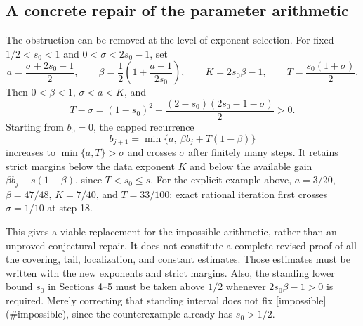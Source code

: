 \documentclass[10pt]{article}
\begin{document}
\subsection*{A concrete repair of the parameter arithmetic}
The obstruction can be removed at the level of exponent selection. For fixed \(1/2<s_0<1\) and \(0<\sigma<2s_0-1\), set \[a=\frac{\sigma+2s_0-1}{2},\qquad
 \beta=\frac12\left(1+\frac{a+1}{2s_0}\right),\qquad
 K=2s_0\beta-1,\qquad T=\frac{s_0(1+\sigma)}2.\] Then \(0<\beta<1\), \(\sigma<a<K\), and \[T-\sigma=(1-s_0)^2+
       \frac{(2-s_0)(2s_0-1-\sigma)}2>0.\] Starting from \(b_0=0\), the capped recurrence \[b_{j+1}=\min\{a,\ \beta b_j+T(1-\beta)\}\] increases to \(\min\{a,T\}>\sigma\) and crosses \(\sigma\) after finitely many steps. It retains strict margins below the data exponent \(K\) and below the available gain \(\beta b_j+s(1-\beta)\), since \(T<s_0\leq s\). For the explicit example above, \(a=3/20\), \(\beta=47/48\), \(K=7/40\), and \(T=33/100\); exact rational iteration first crosses \(\sigma=1/10\) at step 18.\par
This gives a viable replacement for the impossible arithmetic, rather than an unproved conjectural repair. It does not constitute a complete revised proof of all the covering, tail, localization, and constant estimates. Those estimates must be written with the new exponents and strict margins. Also, the standing lower bound \(s_0\) in Sections 4–5 must be taken above \(1/2\) whenever \(2s_0\beta-1>0\) is required. Merely correcting that standing interval does not fix [impossible] (\#impossible), since the counterexample already has \(s_0>1/2\).\par
\end{document}
